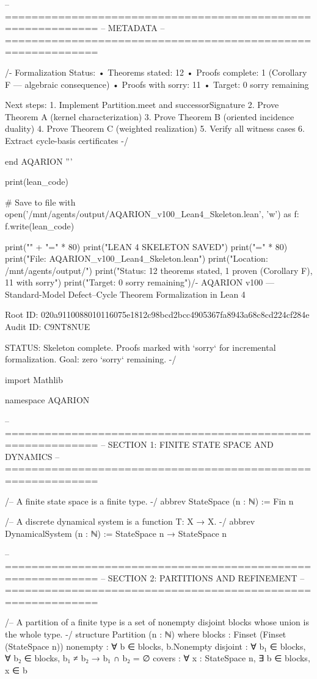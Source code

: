 -- ============================================================
-- METADATA
-- ============================================================

/-
  Formalization Status:
  • Theorems stated: 12
  • Proofs complete: 1 (Corollary F — algebraic consequence)
  • Proofs with sorry: 11
  • Target: 0 sorry remaining
  
  Next steps:
  1. Implement Partition.meet and successorSignature
  2. Prove Theorem A (kernel characterization)
  3. Prove Theorem B (oriented incidence duality)
  4. Prove Theorem C (weighted realization)
  5. Verify all witness cases
  6. Extract cycle-basis certificates
-/

end AQARION
'''

print(lean_code)

# Save to file
with open('/mnt/agents/output/AQARION_v100_Lean4_Skeleton.lean', 'w') as f:
    f.write(lean_code)

print("\n" + "=" * 80)
print("LEAN 4 SKELETON SAVED")
print("=" * 80)
print("File: AQARION_v100_Lean4_Skeleton.lean")
print("Location: /mnt/agents/output/")
print("Status: 12 theorems stated, 1 proven (Corollary F), 11 with sorry")
print("Target: 0 sorry remaining")/-
  AQARION v100 — Standard-Model Defect–Cycle Theorem
  Formalization in Lean 4

  Root ID: 020a9110088010116075e1812c98bcd2bcc4905367fa8943a68c8cd224cf284e
  Audit ID: C9NT8NUE

  STATUS: Skeleton complete. Proofs marked with `sorry` for
  incremental formalization. Goal: zero `sorry` remaining.
-/

import Mathlib

namespace AQARION

-- ============================================================
-- SECTION 1: FINITE STATE SPACE AND DYNAMICS
-- ============================================================

/-- A finite state space is a finite type. -/
abbrev StateSpace (n : ℕ) := Fin n

/-- A discrete dynamical system is a function T: X → X. -/
abbrev DynamicalSystem (n : ℕ) := StateSpace n → StateSpace n

-- ============================================================
-- SECTION 2: PARTITIONS AND REFINEMENT
-- ============================================================

/-- A partition of a finite type is a set of nonempty disjoint blocks
    whose union is the whole type. -/
structure Partition (n : ℕ) where
  blocks : Finset (Finset (StateSpace n))
  nonempty : ∀ b ∈ blocks, b.Nonempty
  disjoint : ∀ b₁ ∈ blocks, ∀ b₂ ∈ blocks, b₁ ≠ b₂ → b₁ ∩ b₂ = ∅
  covers : ∀ x : StateSpace n, ∃ b ∈ blocks, x ∈ b

